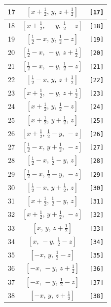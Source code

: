 \documentclass[fleqn,8pt]{jsarticle}
\begin{document}
\begin{longtable}{ccc}
17 & $\left[ x + \frac{1}{2},\, y,\, z + \frac{1}{2} \right]$ & {\tt [17]} \\ \hline
18 & $\left[ x + \frac{1}{2},\, - y,\, \frac{1}{2} - z \right]$ & {\tt [18]} \\ \hline
19 & $\left[ \frac{1}{2} - x,\, y,\, \frac{1}{2} - z \right]$ & {\tt [19]} \\ \hline
20 & $\left[ \frac{1}{2} - x,\, - y,\, z + \frac{1}{2} \right]$ & {\tt [20]} \\ \hline
21 & $\left[ \frac{1}{2} - x,\, - y,\, \frac{1}{2} - z \right]$ & {\tt [21]} \\ \hline
22 & $\left[ \frac{1}{2} - x,\, y,\, z + \frac{1}{2} \right]$ & {\tt [22]} \\ \hline
23 & $\left[ x + \frac{1}{2},\, - y,\, z + \frac{1}{2} \right]$ & {\tt [23]} \\ \hline
24 & $\left[ x + \frac{1}{2},\, y,\, \frac{1}{2} - z \right]$ & {\tt [24]} \\ \hline
25 & $\left[ x + \frac{1}{2},\, y + \frac{1}{2},\, z \right]$ & {\tt [25]} \\ \hline
26 & $\left[ x + \frac{1}{2},\, \frac{1}{2} - y,\, - z \right]$ & {\tt [26]} \\ \hline
27 & $\left[ \frac{1}{2} - x,\, y + \frac{1}{2},\, - z \right]$ & {\tt [27]} \\ \hline
28 & $\left[ \frac{1}{2} - x,\, \frac{1}{2} - y,\, z \right]$ & {\tt [28]} \\ \hline
29 & $\left[ \frac{1}{2} - x,\, \frac{1}{2} - y,\, - z \right]$ & {\tt [29]} \\ \hline
30 & $\left[ \frac{1}{2} - x,\, y + \frac{1}{2},\, z \right]$ & {\tt [30]} \\ \hline
31 & $\left[ x + \frac{1}{2},\, \frac{1}{2} - y,\, z \right]$ & {\tt [31]} \\ \hline
32 & $\left[ x + \frac{1}{2},\, y + \frac{1}{2},\, - z \right]$ & {\tt [32]} \\ \hline
33 & $\left[ x,\, y,\, z + \frac{1}{2} \right]$ & {\tt [33]} \\ \hline
34 & $\left[ x,\, - y,\, \frac{1}{2} - z \right]$ & {\tt [34]} \\ \hline
35 & $\left[ - x,\, y,\, \frac{1}{2} - z \right]$ & {\tt [35]} \\ \hline
36 & $\left[ - x,\, - y,\, z + \frac{1}{2} \right]$ & {\tt [36]} \\ \hline
37 & $\left[ - x,\, - y,\, \frac{1}{2} - z \right]$ & {\tt [37]} \\ \hline
38 & $\left[ - x,\, y,\, z + \frac{1}{2} \right]$ & {\tt [38]} \\ \hline

\end{longtable}
\end{document}
